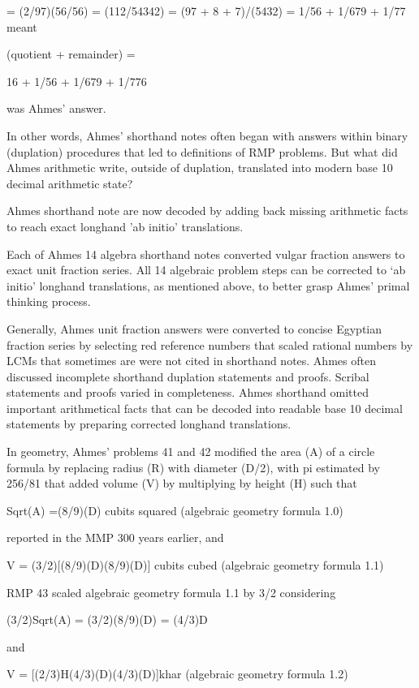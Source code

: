 \documentclass[12pt]{article}
\begin{document}
= (2/97)(56/56) = (112/54342) = (97 + 8 + 7)/(5432) = 1/56 + 1/679 + 1/77 meant

(quotient + remainder) = 

16 + 1/56 + 1/679 + 1/776

was Ahmes’  answer. 

In other words, Ahmes’ shorthand notes often began with answers within binary (duplation) procedures that led to definitions of RMP problems. But what did Ahmes arithmetic write, outside of duplation, translated into modern base 10 decimal arithmetic state?

Ahmes shorthand note are now decoded by adding back missing arithmetic facts to reach exact longhand ’ab initio’ translations.

Each of Ahmes 14 algebra shorthand notes converted vulgar fraction answers to exact unit fraction series. All 14 algebraic problem steps can be corrected to ‘ab initio’ longhand translations, as mentioned above, to better grasp Ahmes’ primal thinking process.

Generally, Ahmes unit fraction answers were converted to concise Egyptian fraction series by selecting red reference numbers that scaled rational numbers by LCMs that sometimes are were not cited in shorthand notes.  Ahmes often discussed incomplete shorthand duplation statements and  proofs. Scribal statements and proofs varied in completeness. Ahmes shorthand omitted important arithmetical facts that can be decoded into readable base 10 decimal statements by preparing corrected longhand translations.

In geometry, Ahmes’  problems 41 and 42 modified the area (A) of a circle formula by replacing radius (R) with diameter (D/2), with  pi estimated by 256/81 that  added volume (V) by multiplying by height (H) such that

Sqrt(A) =(8/9)(D) cubits squared (algebraic geometry formula 1.0)

reported in the MMP 300 years earlier, and

V = (3/2)[(8/9)(D)(8/9)(D)] cubits cubed (algebraic geometry formula 1.1)

RMP 43 scaled algebraic geometry formula 1.1 by 3/2 considering

(3/2)Sqrt(A) = (3/2)(8/9)(D) = (4/3)D

and

V = [(2/3)H(4/3)(D)(4/3)(D)]khar (algebraic geometry formula 1.2)
\end{document}
